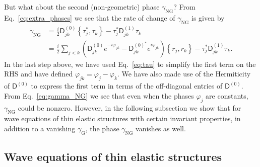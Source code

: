 \begin{subappendices}
But what about the second (non-geometric) phase $\gamma_{\text{NG}}$?
From Eq.~\eqref{eq:extra_phases} we see that the rate of change of $\gamma_{\text{NG}}$ is given by
%
\begin{equation}
  \begin{aligned}
  \dot{\gamma}_{\text{NG}} &= \frac{i}{2} \mathsf{D}^{(0)}_{jk}\left\{\tau_{j}^{*}, \tau_{k}\right\} - \tau_{j}^{*}\mathsf{D}^{(1)}_{jk}\tau_{k}\\
                           &= \frac{i}{2}\sum_{j < k} \left(\mathsf{D}^{(0)}_{jk}e^{-i\varphi_{jk}} - \mathsf{D}_{jk}^{(0)^{*}}e^{i\varphi_{jk}}\right)\left\{r_{j},r_{k}\right\} - \tau_{j}^{*}\mathsf{D}^{(1)}_{jk}\tau_{k}.
  \label{eq:gamma_NG}
  \end{aligned}
\end{equation}
%
In the last step above, we have used Eq.~\eqref{eq:tau} to simplify the first term on the RHS and have defined $\varphi_{jk} = \varphi_{j} - \varphi_{k}$.
We have also made use of the Hermiticity of $\mathsf{D}^{(0)}$ to express the first term in terms of the off-diagonal entries of $\mathsf{D}^{(0)}$.
From Eq.~\eqref{eq:gamma_NG} we see that even when the phases $\varphi_{j}$ are constants, $\gamma_{\text{NG}}$ could be nonzero.
However, in the following subsection we show that for wave equations of thin elastic structures with certain invariant properties, in addition to a vanishing $\gamma_{\text{G}}$, the phase $\gamma_{\text{NG}}$ vanishes as well.

\subsection{Wave equations of thin elastic structures}


\end{subappendices}
